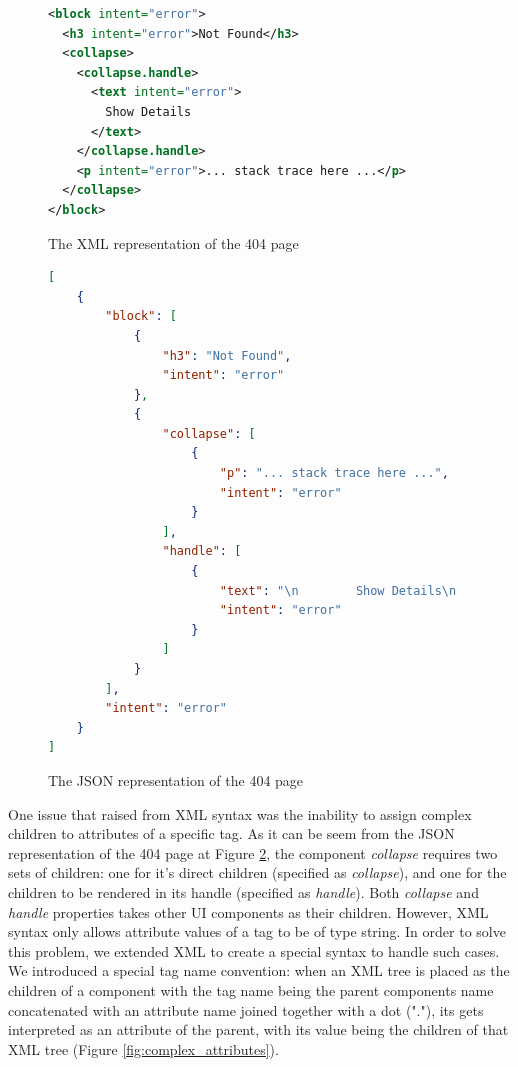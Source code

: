\begin{figure}
\begin{minipage}{\linewidth}
\begin{lstlisting}[language=xml]
<block intent="error">
  <h3 intent="error">Not Found</h3>
  <collapse>
    <collapse.handle>
      <text intent="error">
        Show Details
      </text>
    </collapse.handle>
    <p intent="error">... stack trace here ...</p>
  </collapse>
</block>
\end{lstlisting}
\end{minipage}
\caption{The XML representation of the 404 page}%
\label{fig:syntax_xml}%
\end{figure}

\begin{figure}
\begin{minipage}{\linewidth}
\begin{lstlisting}[language=json]
[
    {
        "block": [
            {
                "h3": "Not Found",
                "intent": "error"
            },
            {
                "collapse": [
                    {
                        "p": "... stack trace here ...",
                        "intent": "error"
                    }
                ],
                "handle": [
                    {
                        "text": "\n        Show Details\n      ",
                        "intent": "error"
                    }
                ]
            }
        ],
        "intent": "error"
    }
]
\end{lstlisting}
\end{minipage}
\caption{The JSON representation of the 404 page}%
\label{fig:syntax_json}%
\end{figure}


One issue that raised from XML syntax was the inability to assign complex children to attributes of a specific tag. As it can be seem from the JSON representation of the 404 page at Figure \ref{fig:syntax_json}, the component \textit{collapse} requires two sets of children: one for it's direct children (specified as \textit{collapse}), and one for the children to be rendered in its handle (specified as \textit{handle}). Both \textit{collapse} and \textit{handle} properties takes other UI components as their children. However, XML syntax only allows attribute values of a tag to be of type string. In order to solve this problem, we extended XML to create a special syntax to handle such cases. We introduced a special tag name convention: when an XML tree is placed as the children of a component with the tag name being the parent components name concatenated with an attribute name joined together with a dot ("."), its gets interpreted as an attribute of the parent, with its value being the children of that XML tree (Figure \ref{fig:complex_attributes}).

